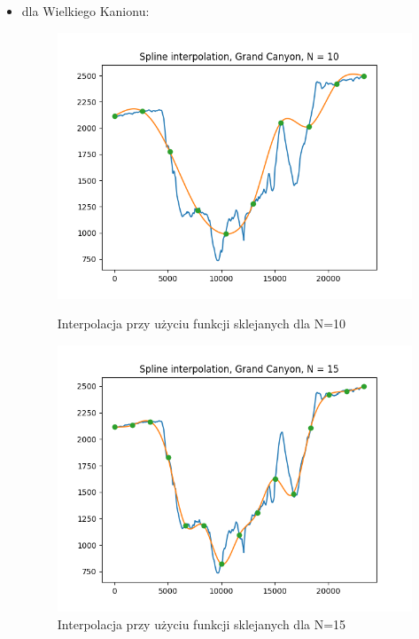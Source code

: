 \documentclass{article}
\begin{document}
\begin{itemize}
    \item dla Wielkiego Kanionu:
    \begin{figure}[!htb]
      \includegraphics[width=\linewidth]{Grand_Canyon_splines_N_10.png}
      \caption{Interpolacja przy użyciu funkcji sklejanych dla N=10}
    \endminipage\hfill
      \includegraphics[width=\linewidth]{Grand_Canyon_splines_N_15.png}
      \caption{Interpolacja przy użyciu funkcji sklejanych dla N=15}
    \endminipage\hfill

\end{figure}
\end{itemize}
\end{document}
